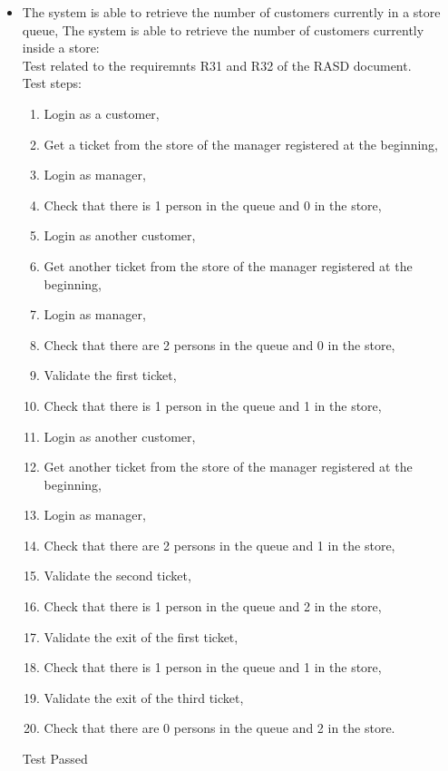 \begin{itemize}

    \item The system is able to retrieve the number of customers currently in a store queue, The system is able to retrieve the number of customers currently inside a store: \\
    Test related to the requiremnts R31 and R32 of the RASD document. \\
    Test steps: \\
    \begin{enumerate}
        \item Login as a customer,

        \item Get a ticket from the store of the manager registered at the beginning,
        \item Login as manager,
        \item Check that there is 1 person in the queue and 0 in the store,
        \item Login as another customer,
        \item Get another ticket from the store of the manager registered at the beginning,
        \item Login as manager,
        \item Check that there are 2 persons in the queue and 0 in the store,
        \item Validate the first ticket,
        \item Check that there is 1 person in the queue and 1 in the store,
        \item Login as another customer,
        \item Get another ticket from the store of the manager registered at the beginning,
        \item Login as manager,
        \item Check that there are 2 persons in the queue and 1 in the store,
        \item Validate the second ticket,
        \item Check that there is 1 person in the queue and 2 in the store,
        \item Validate the exit of the first ticket,
        \item Check that there is 1 person in the queue and 1 in the store,
        \item Validate the exit of the third ticket,
        \item Check that there are 0 persons in the queue and 2 in the store.
    \end{enumerate}
    Test Passed \\


\end{itemize}
